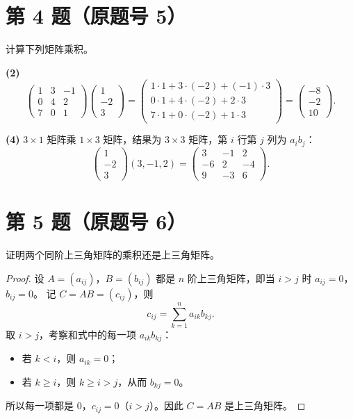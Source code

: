 \documentclass[11pt,a4paper]{ctexart}
\newenvironment{problem}[1]
  {\par\medskip\noindent\textbf{#1}\quad}
  {\par}
\begin{document}
\section*{第 4 题（原题号 5）}

\begin{problem}{}计算下列矩阵乘积。\end{problem}

\textbf{(2)}
\[
\begin{pmatrix}1&3&-1\\0&4&2\\7&0&1\end{pmatrix}
\begin{pmatrix}1\\-2\\3\end{pmatrix}
=\begin{pmatrix}1\cdot1+3\cdot(-2)+(-1)\cdot3\\0\cdot1+4\cdot(-2)+2\cdot3\\7\cdot1+0\cdot(-2)+1\cdot3\end{pmatrix}
=\begin{pmatrix}-8\\-2\\10\end{pmatrix}.
\]

\textbf{(4)} $3\times1$ 矩阵乘 $1\times3$ 矩阵，结果为 $3\times3$ 矩阵，第 $i$ 行第 $j$ 列为 $a_i b_j$：
\[
\begin{pmatrix}1\\-2\\3\end{pmatrix}(3,-1,2)
=\begin{pmatrix}3&-1&2\\-6&2&-4\\9&-3&6\end{pmatrix}.
\]

\section*{第 5 题（原题号 6）}

\begin{problem}{}证明两个同阶上三角矩阵的乘积还是上三角矩阵。\end{problem}

\begin{proof}
设 $A=(a_{ij})$，$B=(b_{ij})$ 都是 $n$ 阶上三角矩阵，即当 $i>j$ 时 $a_{ij}=0$，$b_{ij}=0$。
记 $C=AB=(c_{ij})$，则
\[
c_{ij}=\sum_{k=1}^{n}a_{ik}b_{kj}.
\]
取 $i>j$，考察和式中的每一项 $a_{ik}b_{kj}$：
\begin{itemize}
  \item 若 $k<i$，则 $a_{ik}=0$；
  \item 若 $k\ge i$，则 $k\ge i>j$，从而 $b_{kj}=0$。
\end{itemize}
所以每一项都是 $0$，$c_{ij}=0$（$i>j$）。因此 $C=AB$ 是上三角矩阵。
\end{proof}
\end{document}
